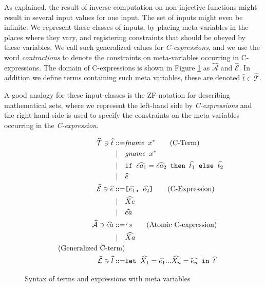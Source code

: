 \documentclass[10pt]{../sigplanconf}
\begin{document}
As explained, the result of inverse-computation on non-injective
functions might result in several input values for one input. The set
of inputs might even be infinite. We represent these classes of
inputs, by placing meta-variables in the places where they vary, and
registering constraints that should be obeyed by these variables.  We
call such generalized values for \textit{C-expressions}, and we use
the word \textit{contractions} to denote the constraints on
meta-variables occurring in C-expressions. The domain of
C-expressions is shown in Figure \ref{fig:cbnf} as
$\mathcal{\widehat{A}}$ and $\mathcal{\widehat{E}}$. In addition we
define terms containing such meta variables, these are denoted
$\widehat{t} \in \widehat{\mathcal{T}}$.

A good analogy for these input-classes is the ZF-notation for
describing mathematical sets, where we represent the left-hand side by
\textit{C-expressions} and the right-hand side is used to specify the
constraints on the meta-variables occurring in the
\textit{C-expression}. 

\begin{figure}\centering
  \begin{align*}
    \widehat{\mathcal{T}} \ni \widehat{t}
      ::=& \texttt{\textit{\rmfamily fname} $x^{*}$} \tag{C-Term} \\
    | \quad & \texttt{\textit{\rmfamily gname} $x^{*}$} \\
    | \quad & \texttt{if $\widehat{ea_1} = \widehat{ea_2}$ then $\widehat{t_1}$ else $\widehat{t_2}$} \\
    | \quad & \widehat{e} \\
    \widehat{\mathcal{E}} \ni \widehat{e} ::=& \texttt{[$\widehat{e_1}$, $\widehat{e_2}$]} \tag{C-Expression} \\
    | \quad & \widehat{Xe} \\
    | \quad & \widehat{ea} \\
    \widehat{\mathcal{A}} \ni \widehat{ea} ::= & \texttt{'}s \tag{Atomic C-expression} \\
    | \quad & \widehat{Xa} \\
    \tag{Generalized C-term} \\
    \widehat{\mathcal{L}} \ni \widehat{l} ::= & \texttt{let $\widehat{X_1} = \widehat{e_1} ... \widehat{X_n} = \widehat{e_n}$ in $\widehat{t}$}
  \end{align*}

\caption{Syntax of terms and expressions with meta variables}
\label{fig:cbnf}
\end{figure}
\end{document}
